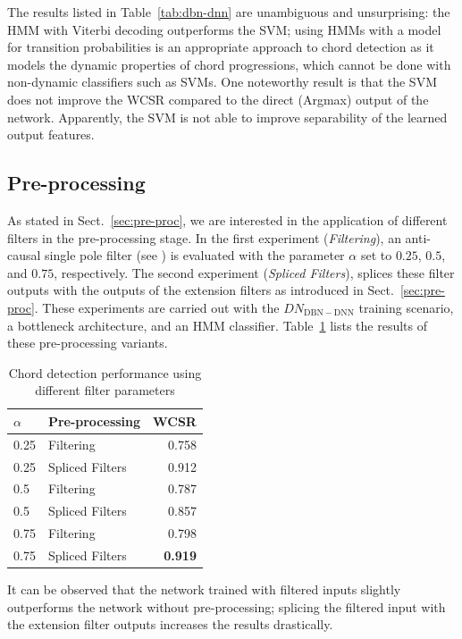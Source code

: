 \documentclass{article}
\begin{document}
The results listed in Table~\ref{tab:dbn-dnn} are unambiguous and unsurprising: the HMM with Viterbi decoding outperforms the SVM; using HMMs with a model for transition probabilities is an appropriate approach to chord detection as it models the dynamic properties of chord progressions, which cannot be done with non-dynamic classifiers such as SVMs. One noteworthy result is that the SVM does not improve the WCSR compared to the direct (Argmax) output of the network. Apparently, the SVM is not able to improve separability of the learned output features.
\subsection{Pre-processing}
As stated in Sect.~\ref{sec:pre-proc}, we are interested in the application of different filters in the pre-processing stage. 
In the first experiment (\textit{Filtering}), an anti-causal single pole filter (see ) is evaluated with the parameter $\alpha$ set to $0.25$, $0.5$, and $0.75$, respectively. The second experiment (\textit{Spliced Filters}), splices these filter outputs with the outputs of the extension filters as introduced in Sect.~\ref{sec:pre-proc}. These experiments are carried out with the  $DN_\mathrm{DBN-DNN}$ training scenario, a bottleneck architecture, and an HMM classifier. Table~\ref{table:filter} lists the results of these pre-processing variants.
\begin{table}[t]
\begin{tabular*}{\columnwidth}{@{\extracolsep{\fill}}llr}
\toprule
$\alpha$    & Pre-processing  & WCSR  \\  \midrule
0.25 & Filtering             & 0.758 \\
0.25 & Spliced Filters & 0.912 \\
0.5  & Filtering             & 0.787 \\
0.5  & Spliced Filters & 0.857 \\
0.75 & Filtering             & 0.798 \\
0.75 & Spliced Filters & \bf{0.919} \\ \bottomrule
\end{tabular*}
\caption{Chord detection performance using different filter parameters}


\label{table:filter}

\end{table}
It can be observed that the network trained with filtered inputs slightly outperforms the network without pre-processing; splicing the filtered input with the extension filter outputs increases the results drastically. 
\end{document}
